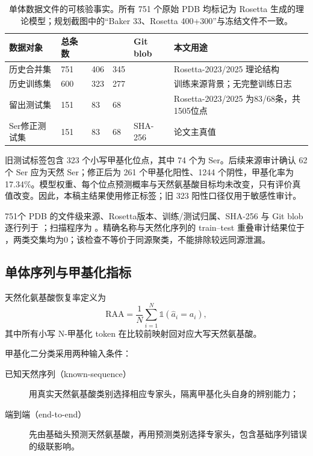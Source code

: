 \begin{table}[H]
\centering
\caption{单体数据文件的可核验事实。所有 751 个原始 PDB 均标记为 Rosetta 生成的理论模型；规划截图中的“Baker 33、Rosetta 400+300”与冻结文件不一致。}
\label{tab:monomer-data}
\begin{tabularx}{\textwidth}{L{31mm}C{16mm}C{16mm}C{16mm}L{44mm}Y}
\toprule
数据对象 & 总条数 &  &  & Git blob & 本文用途 \\
\midrule
历史合并集 & 751 & 406 & 345 &  & Rosetta-2023/2025 理论结构 \\
历史训练集 & 600 & 323 & 277 &  & 训练来源背景；无完整训练日志 \\
留出测试集 & 151 & 83 & 68 &  & Rosetta-2023/2025 为83/68条，共1505位点 \\
Ser修正测试集 & 151 & 83 & 68 & SHA-256  & 论文主真值 \\
\bottomrule
\end{tabularx}
\end{table}

旧测试标签包含 323 个小写甲基化位点，其中 74 个为 Ser。后续来源审计确认 62 个 Ser 应为天然 Ser；修正后为 261 个甲基化阳性、1244 个阴性，甲基化率为 17.34\%。模型权重、每个位点预测概率与天然氨基酸目标均未改变，只有评价真值改变。因此，本稿主结果使用修正标签；旧 323 阳性口径仅用于敏感性审计。

751个 PDB 的文件级来源、Rosetta版本、训练/测试归属、SHA-256 与 Git blob 逐行列于 ；扫描程序为 。精确名称与天然化序列的 train--test 重叠审计结果位于 ，两类交集均为0；该检查不等价于同源聚类，不能排除较远同源泄漏。

\subsection{单体序列与甲基化指标}

天然化氨基酸恢复率定义为
\begin{equation}
\mathrm{RAA}=\frac{1}{N}\sum_{i=1}^{N}\mathbb{1}\!\left(\widehat a_i=a_i\right),
\end{equation}
其中所有小写 N-甲基化 token 在比较前映射回对应大写天然氨基酸。

甲基化二分类采用两种输入条件：
\begin{description}
  \item[已知天然序列（known-sequence）] 用真实天然氨基酸类别选择相应专家头，隔离甲基化头自身的辨别能力；
  \item[端到端（end-to-end）] 先由基础头预测天然氨基酸，再用预测类别选择专家头，包含基础序列错误的级联影响。
\end{description}

